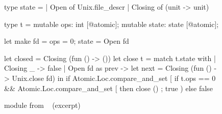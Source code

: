 \begin{figure}[t!]
\begin{ocamlcode}
type state =
  | Open of Unix.file_descr
  | Closing of (unit -> unit)

type t =
  { mutable ops: int [@atomic];
    mutable state: state [@atomic]; }

let make fd = { ops = 0; state = Open fd }

let closed = Closing (fun () -> ())
let close t =
  match t.state with
  | Closing _ -> false
  | Open fd as prev ->
      let next = Closing (fun () -> Unix.close fd) in
      if Atomic.Loc.compare_and_set [%
        if t.ops == 0
        && Atomic.Loc.compare_and_set [%
        then close () ;
        true
      ) else false
\end{ocamlcode}
\caption{ module from \Eio~\cite{eio} (excerpt)}
\label{fig:rcfd}
\end{figure}

